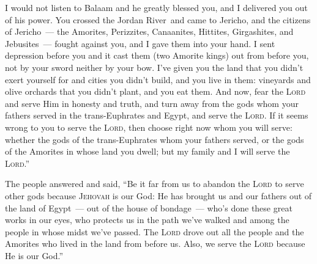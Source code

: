 \begin{inparaenum}
     I would not listen to Balaam and he greatly blessed you, and I delivered you out of his power.%
     You crossed the Jordan River\understood\ and came to Jericho, and the citizens of Jericho~--- the Amorites, Perizzites, Canaanites, Hittites, Girgashites, and Jebusites~--- fought against you, and I gave them into your hand.%
     I sent depression before you and it cast them (two Amorite kings) out from before you, not by your sword neither by your bow.%
     I've given you the land that you didn't exert yourself for and cities you didn't build, and you live in them: vineyards and olive orchards that you didn't plant, and you eat them.\understood%
     And now, fear the \textsc{Lord} and serve Him in honesty and truth, and turn away from the gods whom your fathers served in the trans-Euphrates and Egypt, and serve the \textsc{Lord}.%
     If it seems wrong to you to serve the \textsc{Lord}, then choose right now whom you will serve: whether the gods of the trans-Euphrates whom your fathers served, or the gods of the Amorites in whose land you dwell; but my family and I will serve the \textsc{Lord}.''%
    
     The people answered and said, ``Be it far from us to abandon the \textsc{Lord} to serve other gods%
     because \textsc{Jehovah} is our God: He has brought us and our fathers out of the land of Egypt~--- out of the house of bondage~--- who's done these great works in our eyes, who protects us in the path we've walked and among the people in whose midst we've passed.%
     The \textsc{Lord} drove out all the people and the Amorites who lived in the land from before us. Also, we serve the \textsc{Lord} because He is our God.''%
    

\end{inparaenum}
